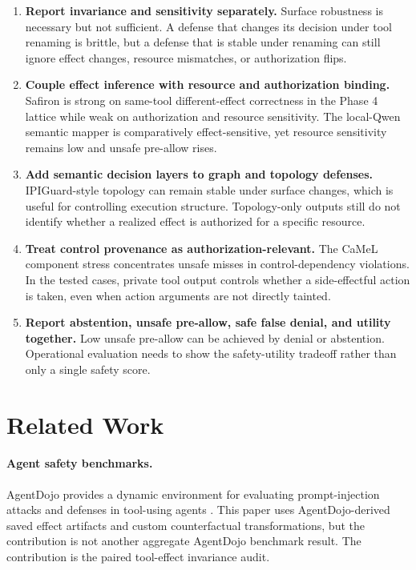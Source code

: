 \documentclass[11pt]{article}
\begin{document}
\begin{enumerate}[leftmargin=*]
  \item \textbf{Report invariance and sensitivity separately.} Surface robustness is necessary but not sufficient. A defense that changes its decision under tool renaming is brittle, but a defense that is stable under renaming can still ignore effect changes, resource mismatches, or authorization flips.
  \item \textbf{Couple effect inference with resource and authorization binding.} Safiron is strong on same-tool different-effect correctness in the Phase 4 lattice while weak on authorization and resource sensitivity. The local-Qwen semantic mapper is comparatively effect-sensitive, yet resource sensitivity remains low and unsafe pre-allow rises.
  \item \textbf{Add semantic decision layers to graph and topology defenses.} IPIGuard-style topology can remain stable under surface changes, which is useful for controlling execution structure. Topology-only outputs still do not identify whether a realized effect is authorized for a specific resource.
  \item \textbf{Treat control provenance as authorization-relevant.} The CaMeL component stress concentrates unsafe misses in control-dependency violations. In the tested cases, private tool output controls whether a side-effectful action is taken, even when action arguments are not directly tainted.
  \item \textbf{Report abstention, unsafe pre-allow, safe false denial, and utility together.} Low unsafe pre-allow can be achieved by denial or abstention. Operational evaluation needs to show the safety-utility tradeoff rather than only a single safety score.
\end{enumerate}

\section{Related Work}
\paragraph{Agent safety benchmarks.}
AgentDojo provides a dynamic environment for evaluating prompt-injection attacks and defenses in tool-using agents \citep{debenedetti2024agentdojo}. This paper uses AgentDojo-derived saved effect artifacts and custom counterfactual transformations, but the contribution is not another aggregate AgentDojo benchmark result. The contribution is the paired tool-effect invariance audit.
\end{document}
